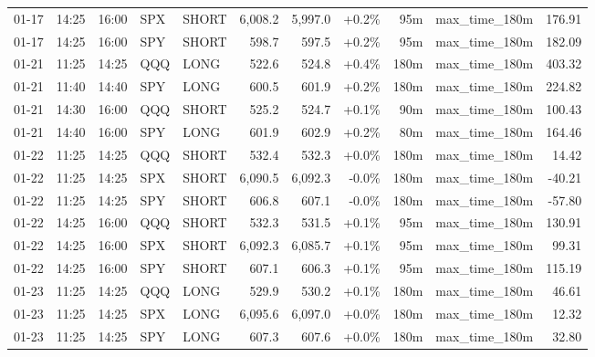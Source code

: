 \documentclass[11pt,a4paper,twoside]{article}
\begin{document}
\begin{center}
\begin{longtable}{>{\color{txtmain}}l l l l l r r r r >{\color{txtmain}}l r}
01-17 & 14:25 & 16:00 & SPX & SHORT & 6,008.2 & 5,997.0 & \textcolor{wingreen}{+0.2\%} & 95m & max\_time\_180m & \textcolor{wingreen}{176.91} \\
01-17 & 14:25 & 16:00 & SPY & SHORT & 598.7 & 597.5 & \textcolor{wingreen}{+0.2\%} & 95m & max\_time\_180m & \textcolor{wingreen}{182.09} \\
01-21 & 11:25 & 14:25 & QQQ & LONG & 522.6 & 524.8 & \textcolor{wingreen}{+0.4\%} & 180m & max\_time\_180m & \textcolor{wingreen}{403.32} \\
01-21 & 11:40 & 14:40 & SPY & LONG & 600.5 & 601.9 & \textcolor{wingreen}{+0.2\%} & 180m & max\_time\_180m & \textcolor{wingreen}{224.82} \\
01-21 & 14:30 & 16:00 & QQQ & SHORT & 525.2 & 524.7 & \textcolor{wingreen}{+0.1\%} & 90m & max\_time\_180m & \textcolor{wingreen}{100.43} \\
01-21 & 14:40 & 16:00 & SPY & LONG & 601.9 & 602.9 & \textcolor{wingreen}{+0.2\%} & 80m & max\_time\_180m & \textcolor{wingreen}{164.46} \\
01-22 & 11:25 & 14:25 & QQQ & SHORT & 532.4 & 532.3 & \textcolor{wingreen}{+0.0\%} & 180m & max\_time\_180m & \textcolor{wingreen}{14.42} \\
01-22 & 11:25 & 14:25 & SPX & SHORT & 6,090.5 & 6,092.3 & \textcolor{lossred}{-0.0\%} & 180m & max\_time\_180m & \textcolor{lossred}{-40.21} \\
01-22 & 11:25 & 14:25 & SPY & SHORT & 606.8 & 607.1 & \textcolor{lossred}{-0.0\%} & 180m & max\_time\_180m & \textcolor{lossred}{-57.80} \\
01-22 & 14:25 & 16:00 & QQQ & SHORT & 532.3 & 531.5 & \textcolor{wingreen}{+0.1\%} & 95m & max\_time\_180m & \textcolor{wingreen}{130.91} \\
01-22 & 14:25 & 16:00 & SPX & SHORT & 6,092.3 & 6,085.7 & \textcolor{wingreen}{+0.1\%} & 95m & max\_time\_180m & \textcolor{wingreen}{99.31} \\
01-22 & 14:25 & 16:00 & SPY & SHORT & 607.1 & 606.3 & \textcolor{wingreen}{+0.1\%} & 95m & max\_time\_180m & \textcolor{wingreen}{115.19} \\
01-23 & 11:25 & 14:25 & QQQ & LONG & 529.9 & 530.2 & \textcolor{wingreen}{+0.1\%} & 180m & max\_time\_180m & \textcolor{wingreen}{46.61} \\
01-23 & 11:25 & 14:25 & SPX & LONG & 6,095.6 & 6,097.0 & \textcolor{wingreen}{+0.0\%} & 180m & max\_time\_180m & \textcolor{wingreen}{12.32} \\
01-23 & 11:25 & 14:25 & SPY & LONG & 607.3 & 607.6 & \textcolor{wingreen}{+0.0\%} & 180m & max\_time\_180m & \textcolor{wingreen}{32.80} \\

\end{longtable}
\end{center}
\end{document}
